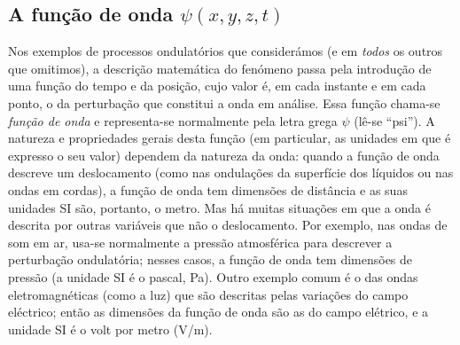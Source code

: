 \subsection{A função de onda $\psi(x,y,z,t)$}
Nos exemplos de processos ondulatórios que considerámos (e em \emph{todos} os
outros que omitimos), a descrição matemática do fenómeno passa pela introdução
de uma função do tempo e da posição, cujo valor é, em cada instante e em cada
ponto, o da perturbação que constitui a onda em análise. Essa função chama-se
\emph{função de onda} e representa-se normalmente pela letra grega $\psi$ (lê-se
``psi''). A natureza e propriedades gerais desta função (em particular, as
unidades em que é expresso o seu valor) dependem da natureza da onda: quando a
função de onda descreve um deslocamento (como nas ondulações da superfície dos
líquidos ou nas ondas em cordas), a função de onda tem dimensões de distância e
as suas unidades SI são, portanto, o metro. Mas há muitas situações em que a
onda é descrita por outras variáveis que não o deslocamento. Por exemplo, nas
ondas de som em ar, usa-se normalmente a pressão atmosférica para descrever a
perturbação ondulatória; nesses casos, a função de onda tem dimensões de
pressão (a unidade SI é o pascal, Pa). Outro exemplo comum é o das ondas
eletromagnéticas (como a luz) que são descritas pelas variações do campo
eléctrico; então as dimensões da função de onda são as do campo elétrico, e a
unidade SI é o volt por metro (V/m).


